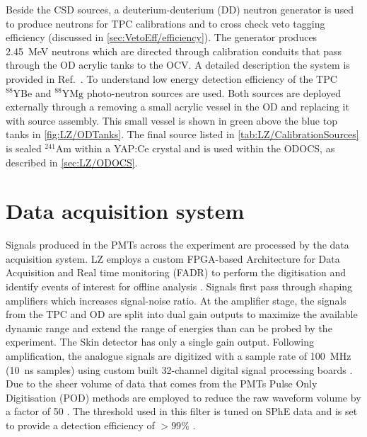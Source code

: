Beside the CSD sources, a deuterium-deuterium (DD) neutron generator is used to produce neutrons for TPC calibrations and to cross check veto tagging efficiency (discussed in \autoref{sec:VetoEff/efficiency}). The generator produces 2.45~MeV neutrons which are directed through calibration conduits that pass through the OD acrylic tanks to the OCV. A detailed description the system is provided in Ref.~\cite{LZ:2024bsz}. To understand low energy detection efficiency of the TPC $^{88}\text{YBe}$ and $^{88}\text{YMg}$ photo-neutron sources are used. Both sources are deployed externally through a removing a small acrylic vessel in the OD and replacing it with source assembly. This small vessel is shown in green above the blue top tanks in  \autoref{fig:LZ/ODTanks}.
The final source listed in \autoref{tab:LZ/CalibrationSources} is sealed $^{241}\text{Am}$ within a YAP:Ce crystal and is used within the ODOCS, as described in \autoref{sec:LZ/ODOCS}.

\section{Data acquisition system}\label{sec:LZ/LZDAQ}
Signals produced in the PMTs across the experiment are processed by the data acquisition system. LZ employs a custom FPGA-based Architecture for Data Acquisition and Real time monitoring (FADR) to perform the digitisation and identify events of interest for offline analysis \cite{LZ:2024bvw,Druszkiewicz:2015pcl}. 
Signals first pass through shaping amplifiers which increases signal-noise ratio. At the amplifier stage, the signals from the TPC and OD are split into dual gain outputs to maximize the available dynamic range and extend the range of energies than can be probed by the experiment. The Skin detector has only a single gain output. Following amplification, the analogue signals are digitized with a sample rate of 100~MHz (10~ns samples) using custom built 32-channel digital signal processing boards \cite{Druszkiewicz:2015pcl}. Due to the sheer volume of data that comes from the PMTs Pulse Only Digitisation (POD) methods are employed to reduce the raw waveform volume by a factor of 50 \cite{LZTDR}. The threshold used in this filter is tuned on SPhE data and is set to provide a detection efficiency of $>99\%$ \cite{LZ:2024bvw}. 

